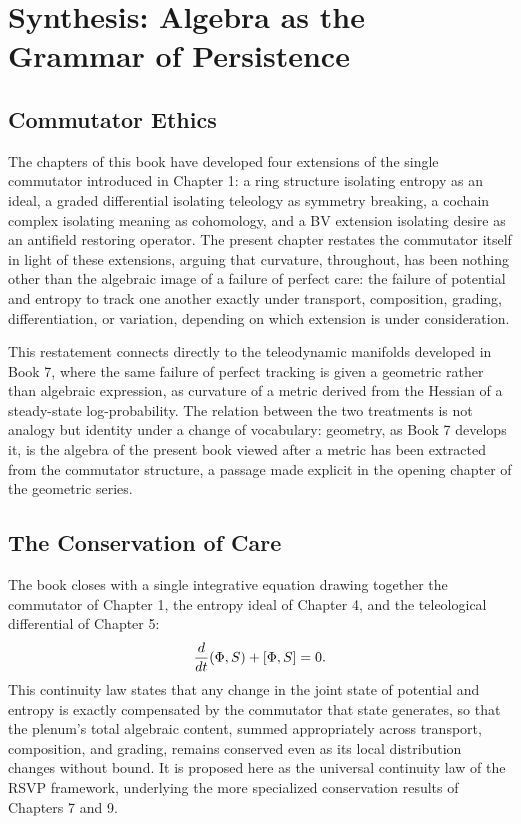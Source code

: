 \part{Synthesis: Algebra as the Grammar of Persistence}

\chapter{Commutator Ethics}

The chapters of this book have developed four extensions of the single commutator introduced in Chapter 1: a ring structure isolating entropy as an ideal, a graded differential isolating teleology as symmetry breaking, a cochain complex isolating meaning as cohomology, and a BV extension isolating desire as an antifield restoring operator. The present chapter restates the commutator itself in light of these extensions, arguing that curvature, throughout, has been nothing other than the algebraic image of a failure of perfect care: the failure of potential and entropy to track one another exactly under transport, composition, grading, differentiation, or variation, depending on which extension is under consideration.

This restatement connects directly to the teleodynamic manifolds developed in Book 7, where the same failure of perfect tracking is given a geometric rather than algebraic expression, as curvature of a metric derived from the Hessian of a steady-state log-probability. The relation between the two treatments is not analogy but identity under a change of vocabulary: geometry, as Book 7 develops it, is the algebra of the present book viewed after a metric has been extracted from the commutator structure, a passage made explicit in the opening chapter of the geometric series.

\chapter{The Conservation of Care}

The book closes with a single integrative equation drawing together the commutator of Chapter 1, the entropy ideal of Chapter 4, and the teleological differential of Chapter 5:
\[
\frac{d}{dt}(\Phi, S) + [\Phi, S] = 0.
\]
This continuity law states that any change in the joint state of potential and entropy is exactly compensated by the commutator that state generates, so that the plenum's total algebraic content, summed appropriately across transport, composition, and grading, remains conserved even as its local distribution changes without bound. It is proposed here as the universal continuity law of the RSVP framework, underlying the more specialized conservation results of Chapters 7 and 9.

